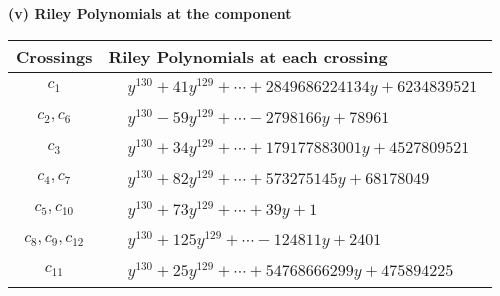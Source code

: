 \documentclass[1p]{elsarticle_modified}
\theoremstyle{definition}
\begin{document}
\newpage\renewcommand{\arraystretch}{1}
\flushleft \textbf{(v) Riley Polynomials at the component}\newline \\
\begin{tabular}{m{50pt}|m{274pt}}
Crossings & \hspace{64pt}Riley Polynomials at each crossing \\
\hline $$\begin{aligned}c_{1}\end{aligned}$$&$\begin{aligned}
&y^{130}+41 y^{129}+\cdots+2849686224134 y+6234839521
\end{aligned}$\\
\hline $$\begin{aligned}c_{2},c_{6}\end{aligned}$$&$\begin{aligned}
&y^{130}-59 y^{129}+\cdots-2798166 y+78961
\end{aligned}$\\
\hline $$\begin{aligned}c_{3}\end{aligned}$$&$\begin{aligned}
&y^{130}+34 y^{129}+\cdots+179177883001 y+4527809521
\end{aligned}$\\
\hline $$\begin{aligned}c_{4},c_{7}\end{aligned}$$&$\begin{aligned}
&y^{130}+82 y^{129}+\cdots+573275145 y+68178049
\end{aligned}$\\
\hline $$\begin{aligned}c_{5},c_{10}\end{aligned}$$&$\begin{aligned}
&y^{130}+73 y^{129}+\cdots+39 y+1
\end{aligned}$\\
\hline $$\begin{aligned}c_{8},c_{9},c_{12}\end{aligned}$$&$\begin{aligned}
&y^{130}+125 y^{129}+\cdots-124811 y+2401
\end{aligned}$\\
\hline $$\begin{aligned}c_{11}\end{aligned}$$&$\begin{aligned}
&y^{130}+25 y^{129}+\cdots+54768666299 y+475894225
\end{aligned}$\\
\hline
\end{tabular}\\~\\
\end{document}

